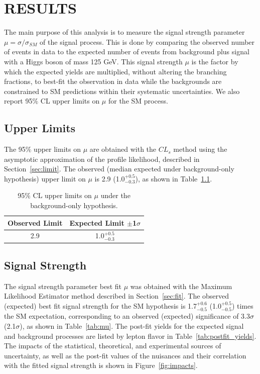 %
%

\chapter{RESULTS}
\label{chap:results}
The main purpose of this analysis is to measure the signal strength parameter $\mu = \sigma/\sigma_{SM}$ of the \tth signal process.
This is done by comparing the observed number of events in data to the expected number of events from background plus \tth signal with a Higgs boson of mass 125 GeV. 
This signal strength $\mu$ is the factor by which the expected \tth yields are multiplied, without altering the branching fractions, to best-fit the observation in data
while the backgrounds are constrained to SM predictions within their systematic uncertainties. We also report 95$\%$ CL upper limits on $\mu$ for the SM \tth process.

\section{Upper Limits}
The 95$\%$ upper limits on $\mu$ are obtained with the $CL_{s}$ method using the asymptotic approximation of the profile likelihood, described in Section~\ref{sec:limit}.
The observed (median expected under background-only hypothesis) upper limit on $\mu$ is 2.9 (1.0$^{+0.5}_{-0.3}$), as shown in Table~\ref{tab:limits}.

\begin{table}[htbp]
\begin{center}
  \caption[Table of Final Limits]{95$\%$ CL upper limits on $\mu$ under the background-only hypothesis.}
    \begin{tabular}{c c} \hline
      Observed Limit & Expected Limit $\pm$1$\sigma$  \\ \hline 
      2.9 & 1.0$^{+0.5}_{-0.3}$  \\
      \hline
    \end{tabular}
    \label{tab:limits}
\end{center}
\end{table}

\section{Signal Strength}
The signal strength parameter best fit $\mu$ was obtained with the Maximum Likelihood Estimator method described in Section~\ref{sec:fit}.
The observed (expected) best fit signal strength for the SM \tth hypothesis is 1.7$^{+0.6}_{-0.5}$ (1.0$^{+0.5}_{-0.5}$) times the SM expectation,
corresponding to an observed (expected) significance of 3.3$\sigma$ (2.1$\sigma$), as shown in Table~\ref{tab:mu}.
The post-fit yields for the expected signal and background processes are listed by lepton flavor in Table~\ref{tab:postfit_yields}.
The impacts of the statistical, theoretical, and experimental sources of uncertainty, as well as the post-fit values of the nuisances and their correlation with
the fitted signal strength is shown in Figure~\ref{fig:impacts}.

